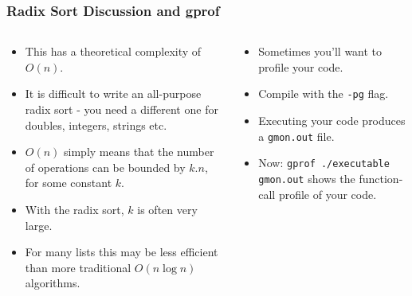 \begin{frame}[fragile]
\frametitle{Radix Sort Discussion and gprof}

\begin{columns}[T]

\begin{column}{0.45\textwidth}
\begin{itemize}[<+->]
\item This has a theoretical complexity of $O(n)$.
\item It is difficult to write an all-purpose radix sort - you need a different one for doubles, integers, strings etc.
\item $O(n)$ simply means that the number of operations can be bounded by $k.n$, for some constant $k$.
\item With the radix sort, $k$ is often very large.
\item For many lists this may be less efficient than more traditional $O(n \log n)$ algorithms.
\end{itemize}
\end{column}

\begin{column}{0.45\textwidth}
\begin{itemize}[<+->]
\item Sometimes you'll want to profile your code.
\item Compile with the \verb^-pg^ flag.
\item Executing your code produces a \verb^gmon.out^ file.
\item Now: \verb^gprof ./executable gmon.out^ shows the function-call profile of your code.
\end{itemize}
\end{column}

\end{columns}
\end{frame}


